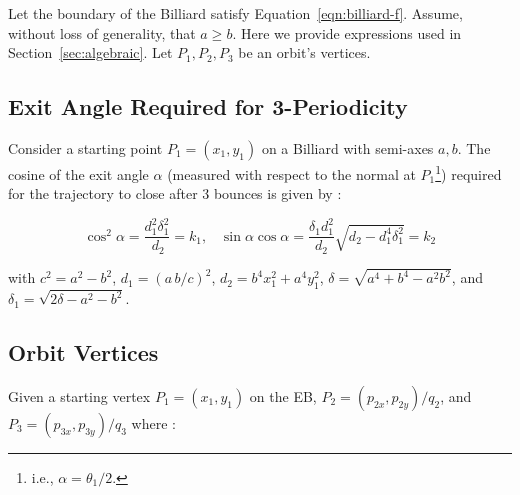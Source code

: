 Let the boundary of the Billiard satisfy Equation~\eqref{eqn:billiard-f}. Assume, without loss of generality, that $a{\geq}b$. Here we provide expressions used in Section~\ref{sec:algebraic}. Let $P_1,P_2,P_3$ be an orbit's vertices.

\subsection{Exit Angle Required for 3-Periodicity}
\label{app:exit-angle}

Consider a starting point $P_1=(x_1,y_1)$ on a Billiard with semi-axes $a,b$. The cosine of the exit angle $\alpha$ (measured with respect to the normal at $P_1$\footnote{i.e., $\alpha=\theta_1/2$.}) required for the trajectory to close after 3 bounces is given by \cite{garcia2019-incenter}: 

\begin{equation*}
\cos^2{\alpha}=\frac{d_1^2\delta_1^2}{\,d_2}=k_1,\;\;\;\sin{\alpha}\cos\alpha=\frac{ \delta_1d_1^2}{d_2 }\sqrt{ d_2 -d_1^4\delta_1^2}=k_2
\label{eqn:cosalpha}
\end{equation*}

\noindent with 
$c^2=a^2-b^2$, $d_1=(a\,b/c)^2$, $d_2={b}^{4}x_1^2 +{a}^{4}y_1^2$, $\delta=\sqrt{a^4+b^4-a^2 b^2}$, and $\delta_1=\sqrt{2 \delta-a^2-b^2}$.

\subsection{Orbit Vertices}
\label{app:p1p2p3}
Given a starting vertex $P_1=(x_1,y_1)$ on the EB, $P_2=(p_{2x},p_{2y})/q_2$, and $P_3=(p_{3x},p_{3y})/q_3$ where \cite{garcia2019-incenter}:


